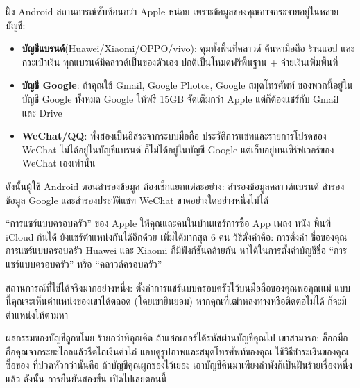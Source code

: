 
ฝั่ง Android สถานการณ์ซับซ้อนกว่า Apple หน่อย เพราะข้อมูลของคุณอาจกระจายอยู่ในหลายบัญชี:

\begin{itemize}
  \item \textbf{บัญชีแบรนด์}(Huawei/Xiaomi/OPPO/vivo): คุมทั้งพื้นที่คลาวด์ ค้นหามือถือ ร้านแอป และกระเป๋าเงิน ทุกแบรนด์มีคลาวด์เป็นของตัวเอง ปกติเป็นโหมดฟรีพื้นฐาน + จ่ายเงินเพิ่มพื้นที่
  \item \textbf{บัญชี Google}: ถ้าคุณใช้ Gmail, Google Photos, Google สมุดโทรศัพท์ ของพวกนี้อยู่ในบัญชี Google ทั้งหมด Google ให้ฟรี 15GB จัดเต็มกว่า Apple แต่ก็ต้องแชร์กับ Gmail และ Drive
  \item \textbf{WeChat/QQ}: ทั้งสองเป็นอิสระจากระบบมือถือ ประวัติการแชทและรายการโปรดของ WeChat ไม่ได้อยู่ในบัญชีแบรนด์ ก็ไม่ได้อยู่ในบัญชี Google แต่เก็บอยู่บนเซิร์ฟเวอร์ของ WeChat เองเท่านั้น
\end{itemize}

ดังนั้นผู้ใช้ Android ตอนสำรองข้อมูล ต้องเช็กแยกแต่ละอย่าง: สำรองข้อมูลคลาวด์แบรนด์ สำรองข้อมูล Google และสำรองประวัติแชท WeChat ขาดอย่างใดอย่างหนึ่งไม่ได้


“การแชร์แบบครอบครัว” ของ Apple ให้คุณและคนในบ้านแชร์การซื้อ App เพลง หนัง พื้นที่ iCloud กันได้ ยังแชร์ตำแหน่งกันได้อีกด้วย เพิ่มได้มากสุด 6 คน วิธีตั้งค่าคือ: การตั้งค่า ชื่อของคุณ การแชร์แบบครอบครัว Huawei และ Xiaomi ก็มีฟังก์ชันคล้ายกัน หาได้ในการตั้งค่าบัญชีชื่อ “การแชร์แบบครอบครัว” หรือ “คลาวด์ครอบครัว”

สถานการณ์ที่ใช้ได้จริงมากอย่างหนึ่ง: ตั้งค่าการแชร์แบบครอบครัวไว้บนมือถือของคุณพ่อคุณแม่ แบบนี้คุณจะเห็นตำแหน่งของเขาได้ตลอด (โดยเขายินยอม) หากคุณที่เฒ่าหลงทางหรือติดต่อไม่ได้ ก็จะมีตำแหน่งให้ตามหา

\begin{tcbwarn}{ผลกรรมของบัญชีถูกขโมย ร้ายกว่าที่คุณคิด}
ถ้าแฮกเกอร์ได้รหัสผ่านบัญชีคุณไป เขาสามารถ: ล็อกมือถือคุณจากระยะไกลแล้วรีดไถเงินค่าไถ่ แอบดูรูปภาพและสมุดโทรศัพท์ของคุณ ใช้วิธีชำระเงินของคุณซื้อของ ที่ปวดหัวกว่านั้นคือ ถ้าบัญชีคุณผูกของไว้เยอะ เอาบัญชีคืนมาเพียงลำพังก็เป็นฝันร้ายเรื่องหนึ่งแล้ว ดังนั้น การยืนยันสองขั้น เปิดไปเลยตอนนี้

\end{tcbwarn}

